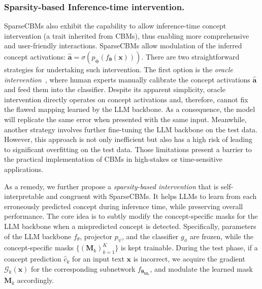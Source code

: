 \documentclass[letterpaper]{article} %
\begin{document}
\subsubsection{Sparsity-based Inference-time intervention.} SparseCBMs also exhibit the capability to allow inference-time concept intervention (a trait inherited from CBMs), thus enabling more comprehensive and user-friendly interactions.  
SparseCBMs allow modulation of the inferred concept activations: $\hat{\bm{a}} = \sigma (p_{\bm\phi}(f_{\bm{\theta}}(\bm{x})))$. There are two straightforward strategies for undertaking such intervention. The first option is the \textit{oracle intervention}~\citep{koh2020concept}, where human experts manually calibrate the concept activations $\hat{\bm{a}}$ and feed them into the classifier. 
Despite its apparent simplicity, oracle intervention directly operates on concept activations and, therefore, cannot fix the flawed mapping learned by the LLM backbone. As a consequence, the model will replicate the same error when presented with the same input. Meanwhile, another strategy involves further fine-tuning the LLM backbone on the test data. However, this approach is not only inefficient but also has a high risk of leading to significant overfitting on the test data. Those limitations present a barrier to the practical implementation of CBMs in high-stakes or time-sensitive applications.  

As a remedy, we further propose a \textit{sparsity-based intervention} that is self-interpretable and congruent with SparseCBMs. It helps LLMs to learn from each erroneously predicted concept during inference time, while preserving overall performance. The core idea is to subtly modify the concept-specific masks for the LLM backbone when a mispredicted concept is detected. Specifically, parameters of the LLM backbone $f_\theta$, projector $p_\psi$, and the classifier $g_\phi$ are frozen, while the concept-specific masks $\{(\bm{M}_k)_{k=1}^K\}$ is kept trainable. During the test phase, if a concept prediction $\hat{c}_k$ for an input text $\bm{x}$ is incorrect, we acquire the gradient ${\mathcal{G}_k}(\bm{x})$ for the corresponding subnetwork $f_{\bm{\theta}_{\bm{M}_k}}$, and modulate the learned mask $\bm{M}_k$ accordingly. 
\end{document}
